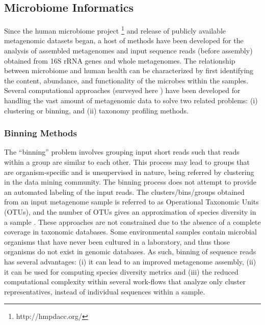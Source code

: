 \subsection{Microbiome Informatics}


Since the human microbiome project \footnote{http://hmpdacc.org/} and 
release of publicly available metagenomic datasets began, a host 
of methods have been developed for the analysis of 
assembled metagenomes and  input  sequence reads (before assembly)
obtained from 16S rRNA genes and whole metagenomes.  
%
%
The relationship between microbiome and human health can be characterized by first
identifying the content, abundance, and functionality of the microbes within the samples. Several
computational approaches (surveyed here \cite{:mo}) have been developed for handling the vast
amount of metagenomic data to solve two related problems: (i) clustering or binning, and (ii) taxonomy profiling methods.
%

\subsubsection{Binning Methods}

The ``binning'' problem  involves grouping input short reads  such that reads within a group are 
similar to each other. This process may lead to groups that are organism-specific and is 
unsupervised in nature, being referred by clustering in the data mining community. 
%
The binning process does not attempt to provide an automated labeling of the input reads. 
%
The clusters/bins/groups obtained from an input metagenome sample 
is referred to as  Operational Taxonomic Units (OTUs), and the number of 
OTUs gives an approximation of species diversity in a sample \cite{schloss2009introducing,schloss2005introducing,sun2009esprit}.
%
These  approaches are not constrained due to the absence of a complete coverage in taxonomic databases. Some 
environmental samples contain microbial organisms that have never been cultured in a laboratory, and thus those organisms do not exist in genomic databases.
As such,  binning of 
sequence reads has several advantages: (i)
        it can lead to an improved  metagenome assembly, (ii) it can be used 
        for computing species diversity metrics \cite{bibm2012} 
        and (iii)
        the  reduced computational
        complexity within several work-flows that analyze only
        cluster representatives, instead of individual sequences
        within a sample.

